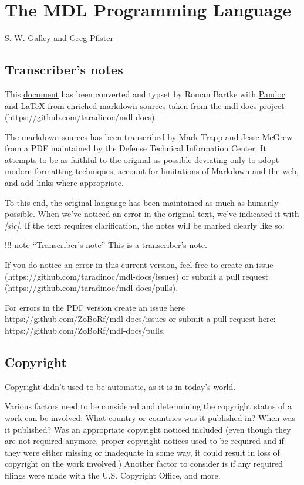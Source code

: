 \documentclass[a4paper,]{article}
\date{}
\begin{document}
\section{The MDL Programming Language}\label{the-mdl-programming-language}

S. W. Galley and Greg Pfister

\subsection{Transcriber's notes}\label{transcribers-notes}

This \href{https://github.com/ZoBoRf/mdl-docs}{document} has been converted and typset by Roman Bartke with
\href{https://pandoc.org/}{Pandoc} and \LaTeX{} from enriched markdown sources taken from the mdl-docs project
(https://github.com/taradinoc/mdl-docs).

The markdown sources has been transcribed by \href{https://marktrapp.com}{Mark Trapp} and
\href{https://bitbucket.org/jmcgrew}{Jesse McGrew} from a \href{http://www.dtic.mil/docs/citations/ADA070930}{PDF
maintained by the Defense Technical Information Center}. It attempts to be as faithful to the original as possible
deviating only to adopt modern formatting techniques, account for limitations of Markdown and the web, and add links where
appropriate.

To this end, the original language has been maintained as much as humanly possible. When we've noticed an error in the
original text, we've indicated it with \emph{{[}sic{]}}. If the text requires clarification, the notes will be marked
clearly like so:

!!! note ``Transcriber's note'' This is a transcriber's note.

If you do notice an error in this current version, feel free to create an issue
(https://github.com/taradinoc/mdl-docs/issues) or submit a pull request (https://github.com/taradinoc/mdl-docs/pulls).

For errors in the PDF version create an issue here https://github.com/ZoBoRf/mdl-docs/issues or submit a pull request here:
https://github.com/ZoBoRf/mdl-docs/pulls.

\subsection{Copyright}\label{copyright}

Copyright didn't used to be automatic, as it is in today's world.

Various factors need to be considered and determining the copyright status of a work can be involved: What country or
countries was it published in? When was it published? Was an appropriate copyright noticed included (even though they are
not required anymore, proper copyright notices used to be required and if they were either missing or inadequate in some
way, it could result in loss of copyright on the work involved.) Another factor to consider is if any required filings were
made with the U.S. Copyright Office, and more.
\end{document}
